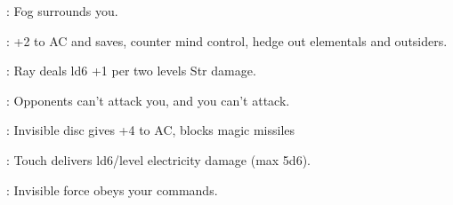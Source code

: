 \begin{multicols}{2}
\begin{description*}
\item[\linkspell{Obscuring Mist}:] Fog surrounds you.
\item[\linkspell{Protection from Good}:] +2 to AC and saves, counter mind control, hedge out elementals and outsiders.
\item[\linkspell{Ray of Enfeeblement}:] Ray deals ld6 +1 per two levels Str damage.
\item[\linkspell{Sanctuary}:] Opponents can't attack you, and you can't attack.
\item[\linkspell{Shield}:] Invisible disc gives +4 to AC, blocks magic missiles
\item[\linkspell{Shocking Grasp}:] Touch delivers ld6/level electricity damage (max 5d6).
\item[\linkspell{Unseen Servant}:] Invisible force obeys your commands.
\end{description*}


\end{multicols}

